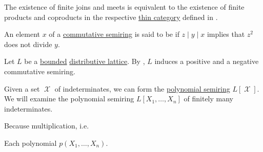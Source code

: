 \begin{remark}\label{rem:lattice_categorical_product}
  The existence of finite joins and meets is equivalent to the existence of finite products and coproducts in the respective \hyperref[def:thin_category]{thin category} defined in .
\end{remark}

\begin{definition}\label{def:square_free}
  An element \( x \) of a \hyperref[def:semiring/commutative]{commutative semiring} is said to be  if \( z \mid y \mid x \) implies that \( z^2 \) does not divide \( y \).
\end{definition}

\begin{remark}\label{rem:lattice_polynomials}
  Let \( L \) be a \hyperref[def:semilattice/bounded]{bounded} \hyperref[def:semilattice/distributive_lattice]{distributive lattice}. By , \( L \) induces a positive and a negative commutative semiring.

  Given a set \( \mscrX \) of indeterminates, we can form the \hyperref[def:polynomial_semiring]{polynomial semiring} \( L[\mscrX] \). We will examine the polynomial semiring \( L[X_1, \ldots, X_n] \) of finitely many indeterminates.

  Because multiplication, i.e.

  Each polynomial \( p(X_1, \ldots, X_n) \).
\end{remark}
